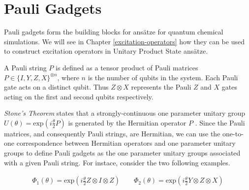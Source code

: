 \chapter{Pauli Gadgets}%
\label{pauli-gadgets}

Pauli gadgets form the building blocks for ansätze for quantum chemical simulations. We will see in Chapter \ref{excitation-operators} how they can be used to construct excitation operators in Unitary Product State ansätze.

A Pauli string $P$ is defined as a tensor product of Pauli matrices $P \in \{I, Y, Z, X\}^{\otimes n}$, where $n$ is the number of qubits in the system. Each Pauli gate acts on a distinct qubit. Thus $Z \otimes X$ represents the Pauli $Z$ and $X$ gates acting on the first and second qubits respectively.

\textit{Stone's Theorem} states that a strongly-continuous one parameter unitary group $U(\theta) = \text{exp} \left( i \frac{\theta}{2} P \right)$ is generated by the Hermitian operator $P$ \cite{Stone1932}. Since the Pauli matrices, and consequently Pauli strings, are Hermitian, we can use the one-to-one correspondence between Hermitian operators and one parameter unitary groups to define Pauli gadgets as the one parameter unitary groups associated with a given Pauli string. For instace, consider the two following examples.

\begin{gather*}
    \Phi_1(\theta) = \text{exp}\left(i \frac{\theta}{2} Z \otimes I \otimes Z \right) \qquad
    \Phi_2(\theta) = \text{exp}\left(i \frac{\theta}{2} Y \otimes Z \otimes X \right)%
\end{gather*}
